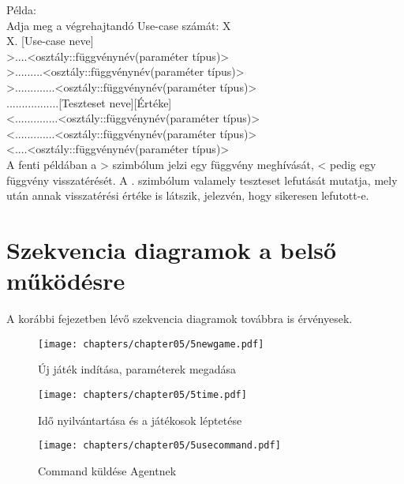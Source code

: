Példa: \\

Adja meg a végrehajtandó Use-case számát: X \\
X. [Use-case neve] \\
>....<osztály::függvénynév(paraméter típus)> \\
>.........<osztály::függvénynév(paraméter típus)> \\
>.............<osztály::függvénynév(paraméter típus)> \\
.................[Teszteset neve][Értéke] \\
<..............<osztály::függvénynév(paraméter típus)> \\
<.............<osztály::függvénynév(paraméter típus)> \\
<....<osztály::függvénynév(paraméter típus)> \\

A fenti példában a > szimbólum jelzi egy függvény meghívását, < pedig egy függvény
visszatérését. A . szimbólum valamely teszteset lefutását mutatja, mely után annak 
visszatérési értéke is látszik, jelezvén, hogy sikeresen lefutott-e. \\


\clearpage
\section{Szekvencia diagramok a belső működésre}

A korábbi fejezetben lévő szekvencia diagramok továbbra is érvényesek.

\begin{figure}[h]
	\begin{center}
		\texttt{[image: chapters/chapter05/5newgame.pdf]}
		\caption{Új játék indítása, paraméterek megadása}
		\label{fig:5newgame}
	\end{center}
\end{figure}


\begin{figure}[h]
	\begin{center}
		\texttt{[image: chapters/chapter05/5time.pdf]}
		\caption{Idő nyilvántartása és a játékosok léptetése}
		\label{fig:5time}
	\end{center}
\end{figure}
\clearpage

\begin{figure}[h]
    \begin{center}
        \texttt{[image: chapters/chapter05/5usecommand.pdf]}
        \caption{Command küldése Agentnek}
        \label{fig:5usecommand}
    \end{center}
\end{figure}
\clearpage

